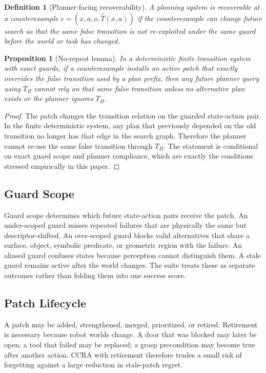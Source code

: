 \documentclass{article}
\newtheorem{definition}{Definition}
\newtheorem{proposition}{Proposition}
\newcommand{\ccra}{\textsc{CCRA}}
\newcommand{\model}{\hat{T}}
\newcommand{\patched}{T_{\Pi}}
\begin{document}
\begin{definition}[Planner-facing recoverability]
A planning system is recoverable at a counterexample $c=(x,a,o,\model(x,a))$ if
the counterexample can change future search so that the same false transition is
not re-exploited under the same guard before the world or task has changed.
\end{definition}

\begin{proposition}[No-repeat lemma]
In a deterministic finite transition system with exact guards, if a
counterexample installs an active patch that exactly overrides the false
transition used by a plan prefix, then any future planner query using
$\patched$ cannot rely on that same false transition unless no alternative plan
exists or the planner ignores $\patched$.
\end{proposition}

\begin{proof}
The patch changes the transition relation on the guarded state-action pair. In
the finite deterministic system, any plan that previously depended on the old
transition no longer has that edge in the search graph. Therefore the planner
cannot re-use the same false transition through $\patched$. The statement is
conditional on exact guard scope and planner compliance, which are exactly the
conditions stressed empirically in this paper.
\end{proof}

\subsection{Guard Scope}

Guard scope determines which future state-action pairs receive the patch. An
under-scoped guard misses repeated failures that are physically the same but
descriptor-shifted. An over-scoped guard blocks valid alternatives that share a
surface, object, symbolic predicate, or geometric region with the failure. An
aliased guard confuses states because perception cannot distinguish them. A
stale guard remains active after the world changes. The suite treats these as
separate outcomes rather than folding them into one success score.

\subsection{Patch Lifecycle}

A patch may be added, strengthened, merged, prioritized, or retired. Retirement
is necessary because robot worlds change. A door that was blocked may later be
open; a tool that failed may be replaced; a grasp precondition may become true
after another action. \ccra{} with retirement therefore trades a small risk of
forgetting against a large reduction in stale-patch regret.
\end{document}
